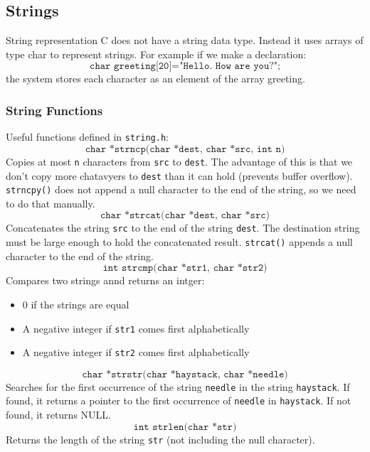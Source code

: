\documentclass[a4paper, 10pt]{article}
\begin{document}
\subsection{Strings}
\begin{conceptbox}{String representation}{}
    C does not have a string data type. Instead it uses arrays of type char to represent strings. For example if we make a declaration:
    $$\texttt{char greeting[20]="Hello. How are you?";}$$
    the system stores each character as an element of the array greeting.
\end{conceptbox}
\subsubsection{String Functions}
Useful functions defined in \texttt{string.h}: \\[2ex]
$$\texttt{char *strncp(char *dest, char *src, int n)} $$
Copies at most \texttt{n} characters from \texttt{src} to \texttt{dest}. The advantage of this is that we don't copy more chatavyers to \texttt{dest} than it can hold (prevents buffer overflow). \texttt{strncpy()} does not append a null character to the end of the string, so we need to do that manually. \\[2ex]
$$\texttt{char *strcat(char *dest, char *src)}$$
Concatenates the string \texttt{src} to the end of the string \texttt{dest}. The destination string must be large enough to hold the concatenated result. \texttt{strcat()} appends a null character to the end of the string. \\[2ex]
$$\texttt{int strcmp(char *str1, char *str2)}$$
Compares two strings annd returns an intger:
\begin{itemize}
    \item 0 if the strings are equal
    \item A negative integer if \texttt{str1} comes first alphabetically
    \item A negative integer if \texttt{str2} comes first alphabetically
\end{itemize}
$$\texttt{char *strstr(char *haystack, char *needle)} $$
Searches for the first occurrence of the string \texttt{needle} in the string \texttt{haystack}. If found, it returns a pointer to the first occurrence of \texttt{needle} in \texttt{haystack}. If not found, it returns NULL. \\[2ex]
$$\texttt{int strlen(char *str)}$$
Returns the length of the string \texttt{str} (not including the null character).
\end{document}
